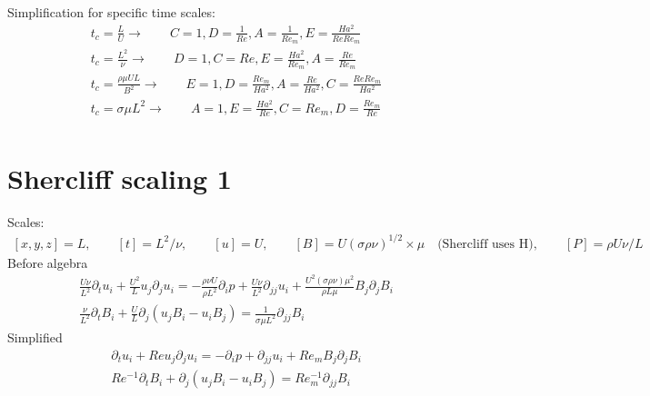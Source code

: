 \documentclass[11pt]{article}
\newcommand{\PD}{\partial}
\begin{document}
Simplification for specific time scales:
\begin{equation}\begin{aligned}
	t_c = \frac{L}{U} \rightarrow \qquad C = 1, D = \frac{1}{Re}, A = \frac{1}{Re_m}, E = \frac{Ha^2}{Re Re_m} \\
	t_c = \frac{L^2}{\nu} \rightarrow \qquad D = 1, C = Re, E = \frac{Ha^2}{Re_m}, A = \frac{Re}{Re_m} \\
	t_c = \frac{\rho \mu U L}{B^2} \rightarrow \qquad E = 1, D = \frac{Re_m}{Ha^2}, A = \frac{Re}{Ha^2}, C = \frac{Re Re_m}{Ha^2} \\
	t_c = \sigma \mu L^2 \rightarrow \qquad A = 1,E = \frac{Ha^2}{Re}, C = Re_m, D = \frac{Re_m}{Re} \\
\end{aligned} \end{equation}

\section{Shercliff scaling 1}
Scales:
\begin{equation}\begin{aligned}
	[x,y,z] = L, \qquad
	[t] = L^2 / \nu, \qquad
	[u] = U, \qquad
	[B] = U (\sigma \rho \nu)^{1/2} \times \mu \quad \text{(Shercliff uses H)}, \qquad
	[P] = \rho U \nu / L
\end{aligned} \end{equation}
Before algebra
\begin{equation}\begin{aligned}
\frac{U \nu}{L^2} \PD_t u_i+ \frac{U^2}{L} u_j\PD_j u_i =-\frac{\rho \nu U}{\rho L^2}\PD_i p+ \frac{U \nu}{L^2} \PD_{jj} u_i + \frac{U^2 (\sigma \rho \nu) \mu^2}{\rho L \mu} B_j \PD_j B_i \\
\frac{\nu}{L^2} \PD_t B_i + \frac{U}{L} \PD_j (u_j B_i - u_i B_j) = \frac{1}{\sigma \mu L^2} \PD_{jj} B_i
\end{aligned} \end{equation}
Simplified
\begin{equation}\begin{aligned}
\PD_t u_i+ Re u_j\PD_j u_i =-\PD_i p+ \PD_{jj} u_i + Re_m B_j \PD_j B_i \\
Re^{-1} \PD_t B_i + \PD_j (u_j B_i - u_i B_j) = Re_m^{-1} \PD_{jj} B_i
\end{aligned} \end{equation}
\end{document}
